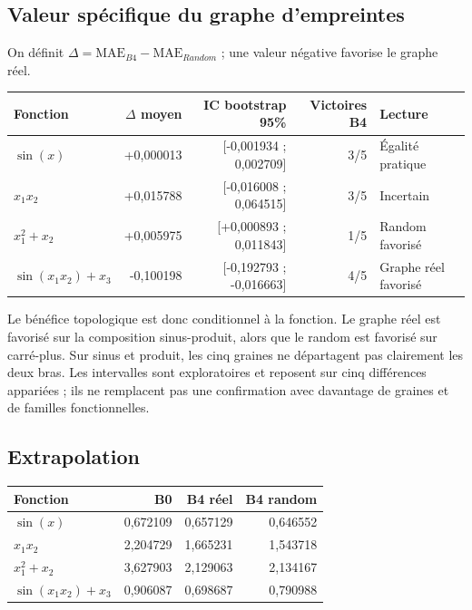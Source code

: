 \documentclass[11pt,a4paper]{article}
\newcommand{\MAE}{\mathrm{MAE}}
\begin{document}
\subsection{Valeur spécifique du graphe d'empreintes}

On définit $\Delta=\MAE_{B4}-\MAE_{Random}$ ; une valeur négative favorise le graphe réel.
\begin{center}
\small
\begin{tabular}{lrrrl}
\toprule
Fonction & $\Delta$ moyen & IC bootstrap 95\% & Victoires B4 & Lecture\\
\midrule
$\sin(x)$ & +0,000013 & [-0,001934 ; 0,002709] & 3/5 & Égalité pratique\\
$x_1x_2$ & +0,015788 & [-0,016008 ; 0,064515] & 3/5 & Incertain\\
$x_1^2+x_2$ & +0,005975 & [+0,000893 ; 0,011843] & 1/5 & Random favorisé\\
$\sin(x_1x_2)+x_3$ & -0,100198 & [-0,192793 ; -0,016663] & 4/5 & Graphe réel favorisé\\
\bottomrule
\end{tabular}
\end{center}

Le bénéfice topologique est donc conditionnel à la fonction. Le graphe réel est favorisé sur la composition sinus-produit, alors que le random est favorisé sur carré-plus. Sur sinus et produit, les cinq graines ne départagent pas clairement les deux bras. Les intervalles sont exploratoires et reposent sur cinq différences appariées ; ils ne remplacent pas une confirmation avec davantage de graines et de familles fonctionnelles.

\subsection{Extrapolation}

\begin{center}
\small
\begin{tabular}{lrrr}
\toprule
Fonction & B0 & B4 réel & B4 random\\
\midrule
$\sin(x)$ & 0,672109 & 0,657129 & 0,646552\\
$x_1x_2$ & 2,204729 & 1,665231 & 1,543718\\
$x_1^2+x_2$ & 3,627903 & 2,129063 & 2,134167\\
$\sin(x_1x_2)+x_3$ & 0,906087 & 0,698687 & 0,790988\\
\bottomrule
\end{tabular}
\end{center}
\end{document}
